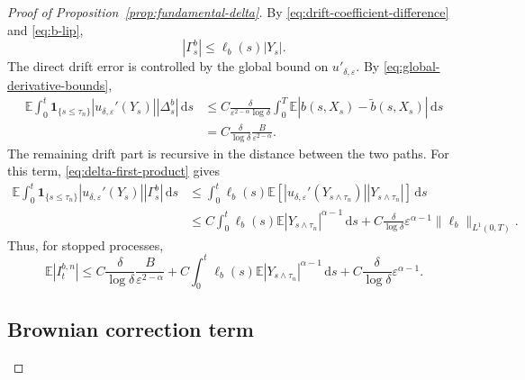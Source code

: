 \documentclass[10pt,a4paper]{amsart}
\newcommand{\E}{\mathbb{E}}
\newcommand{\1}{\mathbf{1}}
\newcommand{\dd}{\,\mathrm{d}}
\newcommand{\wt}{\tilde}
\newcommand{\eps}{\varepsilon}
\begin{document}
\begin{proof}[Proof of Proposition~\ref{prop:fundamental-delta}]
By \eqref{eq:drift-coefficient-difference} and \eqref{eq:b-lip},
\[
  |\Gamma_s^b|\le \ell_b(s)|Y_s|.
\]
The direct drift error is controlled by the global bound on $u'_{\delta,\eps}$. By \eqref{eq:global-derivative-bounds},
\begin{align*}
\E\int_0^t \1_{\{s\le\tau_n\}} |u_{\delta,\eps}'(Y_s)||\Delta_s^b|\dd s
&\le C\frac{\delta}{\eps^{2-\alpha}\log\delta}
\int_0^T\E |b(s,X_s)-\wt b(s,X_s)|\dd s\\
&=C\frac{\delta}{\log\delta}\frac{B}{\eps^{2-\alpha}}.
\end{align*}
The remaining drift part is recursive in the distance between the two paths. For this term, \eqref{eq:delta-first-product} gives
\begin{align*}
\E\int_0^t \1_{\{s\le\tau_n\}} |u_{\delta,\eps}'(Y_s)||\Gamma_s^b|\dd s
&\le \int_0^t \ell_b(s)\E\left[|u_{\delta,\eps}'(Y_{s\wedge\tau_n})||Y_{s\wedge\tau_n}|\right]\dd s\\
&\le C\int_0^t \ell_b(s)\E |Y_{s\wedge\tau_n}|^{\alpha-1}\dd s
+C\frac{\delta}{\log\delta}\eps^{\alpha-1}\|\ell_b\|_{L^1(0,T)}.
\end{align*}
Thus, for stopped processes,
\begin{equation}\label{eq:drift-estimate}
\E |I_{t}^{b,n}|
\le C\frac{\delta}{\log\delta}\frac{B}{\eps^{2-\alpha}}
+C\int_0^t \ell_b(s)\E|Y_{s\wedge\tau_n}|^{\alpha-1}\dd s
+C\frac{\delta}{\log\delta}\eps^{\alpha-1}.
\end{equation}

\subsection{Brownian correction term}
\label{subsec:brownian-term}


\end{proof}
\end{document}
